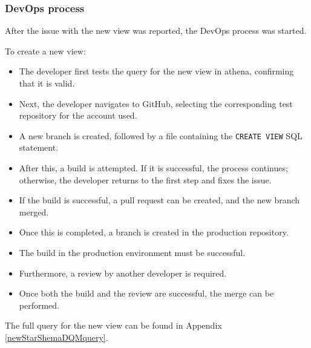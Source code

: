 \subsubsection*{DevOps process}

After the issue with the new view was reported, the DevOps process was started.

To create a new view:
\begin{itemize}
    \item The developer first tests the query for the new view in \gls{athena}, confirming that it is valid.
    \item Next, the developer navigates to GitHub, selecting the corresponding test repository for the account used.
    \item A new branch is created, followed by a file containing the \texttt{CREATE VIEW} SQL statement.
    \item After this, a build is attempted. If it is successful, the process continues; otherwise, the developer returns to the first step and fixes the issue.
    \item If the build is successful, a pull request can be created, and the new branch merged.
    \item Once this is completed, a branch is created in the production repository.
    \item The build in the production environment must be successful.
    \item Furthermore, a review by another developer is required.
    \item Once both the build and the review are successful, the merge can be performed.
\end{itemize}

The full query for the new view can be found in Appendix \ref{newStarShemaDQMquery}.